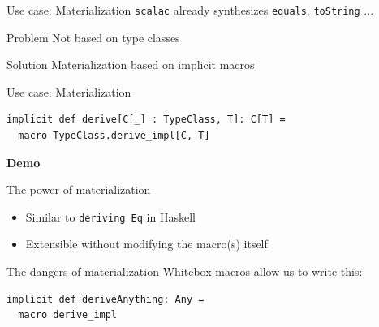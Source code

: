\documentclass{beamer}
\newcommand\demoslide{
  {
    \setbeamertemplate{background}{}
    \begin{frame}[plain]
      \begin{center}\Large\bfseries Demo\end{center}
    \end{frame}
  }
}
\begin{document}
\begin{frame}{Use case: Materialization}
  \texttt{scalac} already synthesizes \texttt{equals}, \texttt{toString} ...

  \vspace{1em}
  \begin{alertblock}{Problem}
    Not based on type classes
  \end{alertblock}

  \vspace{1em}
  \begin{exampleblock}{Solution}
    Materialization based on implicit macros
  \end{exampleblock}
\end{frame}

\begin{frame}[fragile]{Use case: Materialization}
  \begin{verbatim}
implicit def derive[C[_] : TypeClass, T]: C[T] =
  macro TypeClass.derive_impl[C, T]
  \end{verbatim}
\end{frame}

\demoslide

\begin{frame}{The power of materialization}
  \begin{itemize}
    \item Similar to \texttt{deriving Eq} in Haskell
    \item Extensible without modifying the macro(s) itself
  \end{itemize}
\end{frame}

\begin{frame}[fragile]{The dangers of materialization}
  Whitebox macros allow us to write this:
  \vspace{1em}

  \begin{verbatim}
implicit def deriveAnything: Any =
  macro derive_impl
  \end{verbatim}
\end{frame}
\end{document}

